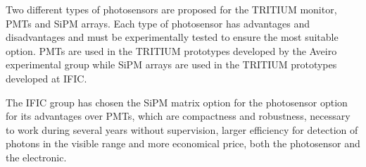 Two different types of photosensors are proposed for the TRITIUM monitor, PMTs and SiPM arrays. Each type of photosensor has advantages and disadvantages and must be experimentally tested to ensure the most suitable option. PMTs are used in the TRITIUM prototypes developed by the Aveiro experimental group while SiPM arrays are used in the TRITIUM prototypes developed at IFIC.


The IFIC group has chosen the SiPM matrix option for the photosensor option for its advantages over PMTs, which are compactness and robustness, necessary to work during several years without supervision, larger efficiency for detection of photons in the visible range and more economical price, both the photosensor and the electronic. %